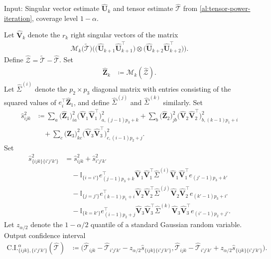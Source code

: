 \documentclass[10pt]{article}
\newcommand{\0}{{\mathbf{0}}}
\newcommand{\1}{{\mathbf{1}}}
\renewcommand{\t}{^{\top}}
\newcommand{\uhat}{\mathbf{\hat{U}}}
\renewcommand{\tilde}{\widetilde}
\renewcommand{\hat}{\widehat}
\renewcommand{\hat}{\widehat}
\begin{document}
\begin{algorithm}[t]
	\caption{Confidence Intervals for $\mathcal{T}_{ijk} - \mathcal{T}_{i'j'k'}$}
	\begin{algorithmic}[1]
		\State Input:  Singular vector estimate $\uhat_k$ and tensor estimate $\mathcal{\hat T}$ from \cref{al:tensor-power-iteration}, coverage level $1 - \alpha$.
		
			\State Let $\mathbf{\hat V}_k$ denote the $r_k$ right singular vectors of the matrix
		\begin{align*}
		    \mathcal{M}_k\big(  \mathcal{\tilde T} \big) \bigg( \big(\uhat_{k+1} \uhat_{k+1}\t \big) \otimes \big(\uhat_{k+2} \uhat_{k+2}\t \big) \bigg).
		\end{align*}
	\State Define $\mathcal{\hat Z} = \mathcal{\tilde T} - \mathcal{\hat T}$. Set
		\begin{align*}
		   \mathbf{\hat Z}_k &\coloneqq \mathcal{M}_k( \mathcal{\hat Z}).
		\end{align*}
	\State Let $\hat \Sigma^{(i)}$ denote the $p_2 \times p_3$ diagonal matrix with entries consisting of the squared values of $e_i\t \mathbf{\hat Z}_1$, and define $\hat \Sigma^{(j)}$ and $\hat \Sigma^{(k)}$ similarly.  \State Set
\begin{align*}
    \hat s^2_{ijk} &\coloneqq \sum_{a} \big( \mathbf{\hat Z}_1 \big)_{ia}^2 \big( \mathbf{\hat V}_1 \mathbf{\hat V}_1\t \big)_{a,(j-1)p_3 + k}^2 + \sum_{b} \big( \mathbf{\hat Z}_2 \big)_{jb}^2 \big( \mathbf{\hat V}_2 \mathbf{\hat V}_2\t \big)_{b,(k-1)p_1 + i}^2 \\
    &\quad + \sum_{c} \big( \mathbf{\hat Z}_3 \big)_{kc}^2 \big( \mathbf{\hat V}_3 \mathbf{\hat V}_3\t \big)_{c,(i-1)p_2 + j}^2.
\end{align*}
\State Set
\begin{align*}
    \hat s_{\{ijk\}\{i'j'k'\}}^2 &= \hat s^2_{ijk} + \hat s^2_{i'j'k'}  \\
    &\quad - \mathbb{I}_{\{i= i'\}} e_{(j-1)p_3 + k}\t  \mathbf{\hat V}_1 \mathbf{\hat V}_1\t \hat \Sigma^{(i)} \mathbf{\hat V}_1 \mathbf{\hat V}_1\t e_{(j'-1)p_3 + k'} \\
    &\quad - \mathbb{I}_{\{j= j'\}} e_{(k-1)p_1 + i}\t  \mathbf{\hat V}_2 \mathbf{\hat V}_2\t\hat \Sigma^{(j)} \mathbf{\hat V}_2 \mathbf{\hat V}_2\t e_{(k'-1)p_3 + i'}  \\
    &\quad - \mathbb{I}_{\{k= k'\}} e_{(i-1)p_2 + j}\t  \mathbf{\hat V}_3 \mathbf{\hat V}_3\t \hat \Sigma^{(k)} \mathbf{\hat V}_3 \mathbf{\hat V}_3\t e_{(i'-1)p_2 +j'}.
\end{align*}
\State Let $z_{\alpha/2}$ denote the $1 - \alpha/2$ quantile of a standard Gaussian random variable.
\State Output confidence interval
\begin{align*}
    \mathrm{C.I.}^{\alpha}_{\{ijk\},\{i'j'k'\}}( \mathcal{\hat T}) &\coloneqq \big( \mathcal{\hat T}_{ijk} - \mathcal{\hat T}_{i'j'k'} - z_{\alpha/2} \hat s_{\{ijk\}\{i'j'k'\}}, \mathcal{\hat T}_{ijk} - \mathcal{\hat T}_{i'j'k'} + z_{\alpha/2} \hat s_{\{ijk\}\{i'j'k'\}}\big).
\end{align*}
		\end{algorithmic}
		\label{al:entrytesting}
\end{algorithm}
\end{document}

